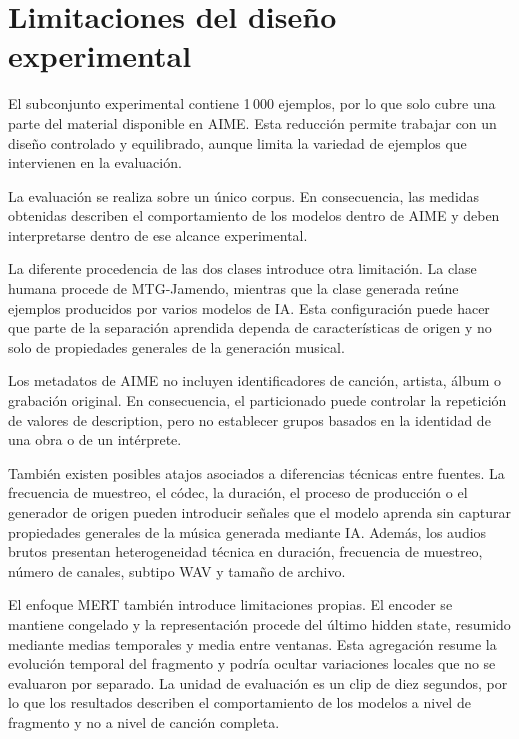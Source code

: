 \section{Limitaciones del diseño experimental}

El subconjunto experimental contiene 1\,000 ejemplos, por lo que solo cubre una parte del material disponible en AIME. Esta reducción permite trabajar con un diseño controlado y equilibrado, aunque limita la variedad de ejemplos que intervienen en la evaluación.

La evaluación se realiza sobre un único corpus. En consecuencia, las medidas obtenidas describen el comportamiento de los modelos dentro de AIME y deben interpretarse dentro de ese alcance experimental.

La diferente procedencia de las dos clases introduce otra limitación. La clase humana procede de MTG-Jamendo, mientras que la clase generada reúne ejemplos producidos por varios modelos de IA. Esta configuración puede hacer que parte de la separación aprendida dependa de características de origen y no solo de propiedades generales de la generación musical.

Los metadatos de AIME no incluyen identificadores de canción, artista, álbum o grabación original. En consecuencia, el particionado puede controlar la repetición de valores de description, pero no establecer grupos basados en la identidad de una obra o de un intérprete.

También existen posibles atajos asociados a diferencias técnicas entre fuentes. La frecuencia de muestreo, el códec, la duración, el proceso de producción o el generador de origen pueden introducir señales que el modelo aprenda sin capturar propiedades generales de la música generada mediante IA. Además, los audios brutos presentan heterogeneidad técnica en duración, frecuencia de muestreo, número de canales, subtipo WAV y tamaño de archivo.

El enfoque MERT también introduce limitaciones propias. El encoder se mantiene congelado y la representación procede del último hidden state, resumido mediante medias temporales y media entre ventanas. Esta agregación resume la evolución temporal del fragmento y podría ocultar variaciones locales que no se evaluaron por separado. La unidad de evaluación es un clip de diez segundos, por lo que los resultados describen el comportamiento de los modelos a nivel de fragmento y no a nivel de canción completa.
